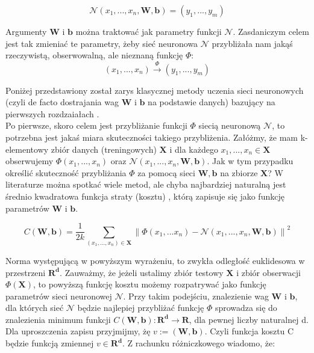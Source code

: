 \documentclass[licencjacka]{pracamgr}
\newcommand{\norm}[1]{\left\lVert#1\right\rVert}
\begin{document}
$$\mathcal{N}(x_{1},...,x_{n}, \mathbf{W}, \mathbf{b}) = (y_{1},...,y_{m})$$

Argumenty $\mathbf{W}$  i $\mathbf{b}$ można traktować jak parametry funkcji $\mathbf{\mathcal{N}}$. Zasdaniczym celem jest tak zmieniać te parametry, żeby sieć neuronowa $\mathbf{\mathcal{N}}$ przybliżała nam jakąś rzeczywistą, obserwowalną, ale nieznaną funkcję $\Phi$: 
$$ (x_{1},...,x_{n})\stackrel{\Phi}{\rightarrow}(y_{1},...,y_{m})$$

Poniżej przedstawiony został zarys klasycznej metody uczenia sieci neuronowych (czyli de facto dostrajania wag   $\mathbf{W}$  i $\mathbf{b}$ na podstawie danych) bazujący na pierwszych rozdzaiałach \cite{nn}.\\

 
Po pierwsze, skoro celem jest przybliżanie funkcji $\Phi$ siecią neuronową $\mathbf{\mathcal{N}}$, to potrzebna jest jakaś miara skuteczności takiego przybliżenia.  Załóżmy, że mam k-elementowy zbiór danych (treningowych) $\mathbf{X}$ i dla każdego $x_{1},...,x_{n}\in\mathbf{X}$ obserwujemy $\Phi(x_{1},...,x_{n})$ oraz $\mathbf{\mathcal{N}}(x_{1},...,x_{n}, \mathbf{W}, \mathbf{b})$. Jak w tym przypadku określić skuteczność przybliżania $\Phi$ za pomocą sieci $\mathbf{W}, \mathbf{b}$ na zbiorze $\mathbf{X}$? W literaturze można spotkać wiele metod, ale chyba najbardziej naturalną jest średnio kwadratowa funkcja straty (kosztu) , którą zapisuje się jako funkcję parametrów $\mathbf{W}$ i $\mathbf{b}$.
 
\begin{equation}
	\label{Cost_function}
	C(\mathbf{W}, \mathbf{b}) = \frac{1}{2k}\sum_{(x_{1},...,x_{n})\in\mathbf{X}}{\norm{\Phi(x_{1},...x_{n}) - \mathbf{\mathcal{N}}(x_{1},...,x_{n}, \mathbf{W}, \mathbf{b} )} } ^{2}
\end{equation}
 
 
Norma występującą w powyższym wyrażeniu, to zwykła odległość euklidesowa w przestrzeni $\mathbf{R^{d}}$. Zauważmy, że jeżeli ustalimy zbiór testowy $\mathbf{X}$ i zbiór obserwacji $\Phi(\mathbf{X})$, to powyższą funkcję kosztu możemy rozpatrywać jako funkcję parametrów sieci neuronowej $\mathbf{\mathcal{N}}$. Przy takim podejściu, znalezienie wag $\mathbf{W}$ i $\mathbf{b}$, dla których sieć $\mathbf{\mathcal{N}}$ będzie najlepiej przybliżać funkcję $\Phi$ sprowadza się do znalezienia minimum funkcji $C(\mathbf{W}, \mathbf{b}):\mathbf{R^{d}}\rightarrow\mathbf{R}$, dla pewnej liczby naturalnej d.  Dla uproszczenia zapisu przyjmijmy, żę $v:=(\mathbf{W}, \mathbf{b})$. Czyli funkcja kosztu C będzie funkcją zmiennej $v\in\mathbf{R^{d}}$. Z rachunku różniczkowego wiadomo, że:
 
\end{document}
